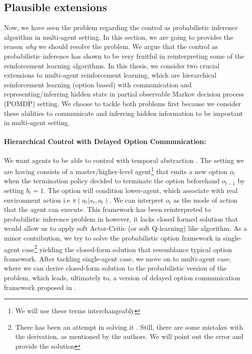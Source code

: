 \subsection{Plausible extensions}
\label{sec:chap1-MEMARL-Extensions}
Now, we have seen the problem regarding the control as probabilistic inference algorithm in multi-agent setting. In this section, we are going to provides the reason \textit{why} we should resolve the problem. We argue that the control as probabilistic inference has shown to be very fruitful in reinterpreting some of the reinforcement learning algorithms. In this thesis, we consider two crucial extensions to multi-agent reinforcement learning, which are hierarchical reinforcement learning (option based) with communication and representing/inferring hidden state in partial observable Markov decision process (POMDP) setting. We choose to tackle both problems first because we consider these abilities to communicate and inferring hidden information to be important in multi-agent setting. 

\paragraph{Hierarchical Control with Delayed Option Communication:} 
We want agents to be able to control with temporal abstraction \cite{sutton1999between, bacon2017option}. The setting we are having consists of a master/higher-level agent\footnote{We will use these terms interchangeably} that emits a new option $o_t$ when the termination policy decided to terminate the option beforehand $o_{t-1}$ by setting $b_t = 1$. The option will condition lower-agent, which associate with real environment action i.e $\pi(a_t | s_t, o_t)$. We can interpret $o_t$ as the mode of action that the agent can execute. This framework has been reinterpreted to probabilistic inference problem in \cite{igl2019multitask} however, it lacks closed formed solution that would allow us to apply soft Actor-Critic (or soft Q-learning) like algorithm. As a minor contribution, we try to solve the probabilistic option framework in single-agent case\footnote{There has been an attempt in solving it \cite{lobo2019soft}. Still, there are some mistakes with the derivation, as mentioned by the authors. We will point out the error and provide the solution} yielding the closed-form solution that resemblance typical option framework. After tackling single-agent case, we move on to multi-agent case, where we can derive closed-form solution to the probabilistic version of the problem, which leads, ultimately to, a  version of delayed option communication framework proposed in \cite{han2019multi}. 


